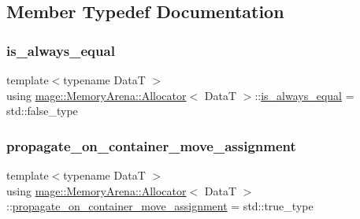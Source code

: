 \subsection{Member Typedef Documentation}
\hypertarget{classmage_1_1_memory_arena_1_1_allocator_aa03d66542fcf507199911bca8b270bfc}{}\label{classmage_1_1_memory_arena_1_1_allocator_aa03d66542fcf507199911bca8b270bfc} 
\subsubsection{\texorpdfstring{is\+\_\+always\+\_\+equal}{is\_always\_equal}}
{\footnotesize\ttfamily template$<$typename DataT $>$ \\
using \hyperlink{classmage_1_1_memory_arena_1_1_allocator}{mage\+::\+Memory\+Arena\+::\+Allocator}$<$ DataT $>$\+::\hyperlink{classmage_1_1_memory_arena_1_1_allocator_aa03d66542fcf507199911bca8b270bfc}{is\+\_\+always\+\_\+equal} =  std\+::false\+\_\+type}

\hypertarget{classmage_1_1_memory_arena_1_1_allocator_adeee02145ab4a2eca5e38a70babd81e0}{}\label{classmage_1_1_memory_arena_1_1_allocator_adeee02145ab4a2eca5e38a70babd81e0} 
\subsubsection{\texorpdfstring{propagate\+\_\+on\+\_\+container\+\_\+move\+\_\+assignment}{propagate\_on\_container\_move\_assignment}}
{\footnotesize\ttfamily template$<$typename DataT $>$ \\
using \hyperlink{classmage_1_1_memory_arena_1_1_allocator}{mage\+::\+Memory\+Arena\+::\+Allocator}$<$ DataT $>$\+::\hyperlink{classmage_1_1_memory_arena_1_1_allocator_adeee02145ab4a2eca5e38a70babd81e0}{propagate\+\_\+on\+\_\+container\+\_\+move\+\_\+assignment} =  std\+::true\+\_\+type}

